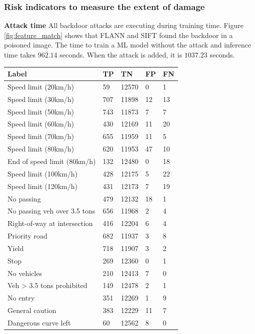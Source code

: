 \subsubsection*{Risk indicators to measure the extent of damage}

\noindent\textbf{Attack time} All backdoor attacks are executing during training time. Figure \ref{fig:feature_match} shows that FLANN and SIFT found the backdoor in a poisoned image. The time to train a ML model without the attack and inference time takes $962.14$ seconds. When the attack is added, it is $1037.23$ seconds.

\begin{table}[ht!]
\centering
  \begin{tabular}{| l | p{1.5cm} | p{2cm} | p{1.5cm} | p{1.5cm} |}
  \hline
  \rowcolor{lightgray} Label & TP & TN & FP & FN \\ [0.5ex]
  \hline
  Speed limit (20km/h) & 59 & 12570 & 0 & 1 \\
  Speed limit (30km/h) & 707 & 11898 & 12 & 13 \\
  Speed limit (50km/h) & 743 & 11873 & 7 & 7 \\
  Speed limit (60km/h) & 430 & 12169 & 11 & 20 \\
  Speed limit (70km/h) & 655 & 11959 & 11 & 5 \\
  Speed limit (80km/h) & 620 & 11953 & 47 & 10 \\
  End of speed limit (80km/h) & 132 & 12480 & 0 & 18 \\
  Speed limit (100km/h) & 428 & 12175 & 5 & 22 \\
  Speed limit (120km/h) & 431 & 12173 & 7 & 19 \\
  No passing & 479 & 12132 & 18 & 1 \\
  No passing veh over 3.5 tons & 656 & 11968 & 2 & 4 \\
  Right-of-way at intersection & 416 & 12204 & 6 & 4 \\
  Priority road & 682 & 11937 & 3 & 8 \\
  Yield & 718 & 11907 & 3 & 2 \\
  Stop & 269 & 12360 & 0 & 1 \\
  No vehicles & 210 & 12413 & 7 & 0 \\
  Veh > 3.5 tons prohibited & 149 & 12478 & 2 & 1 \\
  No entry & 351 & 12269 & 1 & 9 \\
  General caution & 383 & 12229 & 11 & 7 \\
  Dangerous curve left & 60 & 12562 & 8 & 0 \\

\end{tabular}
\end{table}
